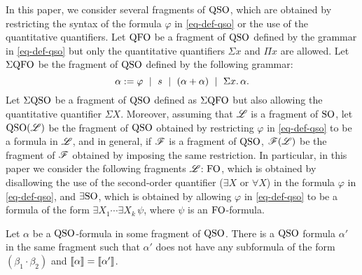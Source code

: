 In this paper, we consider several fragments of ${\rm QSO}$, which are obtained by restricting the syntax of the formula $\varphi$ in \eqref{eq-def-qso} or the use of the quantitative quantifiers. Let ${\rm QFO}$ be a fragment of ${\rm QSO}$ defined by the grammar in \eqref{eq-def-qso} but only the quantitative quantifiers $\Sigma x$ and $\Pi x$ are allowed. Let $\Sigma{\rm QFO}$ be the fragment of ${\rm QSO}$ defined by the following grammar:
$$
\alpha := \varphi \ \mid \ s \ \mid \ (\alpha + \alpha) \ \mid \ \Sigma{x}.\, \alpha.
$$ Let $\Sigma{\rm QSO}$ be a fragment of ${\rm QSO}$ defined as $\Sigma{\rm QFO}$ but also allowing the quantitative quantifier $\Sigma X$. Moreover, assuming that $\mathscr{L}$ is a fragment of ${\rm SO}$, let ${\rm QSO}(\mathscr{L})$ be the fragment of ${\rm QSO}$ obtained by restricting $\varphi$ in \eqref{eq-def-qso} to be a formula in $\mathscr{L}$, and in general, if $\mathscr{F}$ is a fragment of ${\rm QSO}$, $\mathscr{F}(\mathscr{L})$ be the fragment of $\mathscr{F}$ obtained by imposing the same restriction. In particular, in this paper we consider the following fragments $\mathscr{L}$: ${\rm FO}$, which is obtained by disallowing the use of the second-order quantifier ($\exists X$ or $\forall X$) in the formula $\varphi$ in \eqref{eq-def-qso}, and $\exists{\rm SO}$, which is obtained by allowing $\varphi$ in \eqref{eq-def-qso} to be a formula of the form $\exists X_1 \cdots \exists X_k \, \psi$, where $\psi$ is an ${\rm FO}$-formula. 

\begin{theorem} \label{no-mult}
	Let $\alpha$ be a ${\rm QSO}$-formula in some fragment of ${\rm QSO}$. There is a ${\rm QSO}$ formula $\alpha'$ in the same fragment such that $\alpha'$ does not have any subformula of the form $(\beta_1 \cdot \beta_2)$ and ${\llbracket{}{\alpha}\rrbracket} = {\llbracket{}{\alpha'}\rrbracket}$.
\end{theorem}
